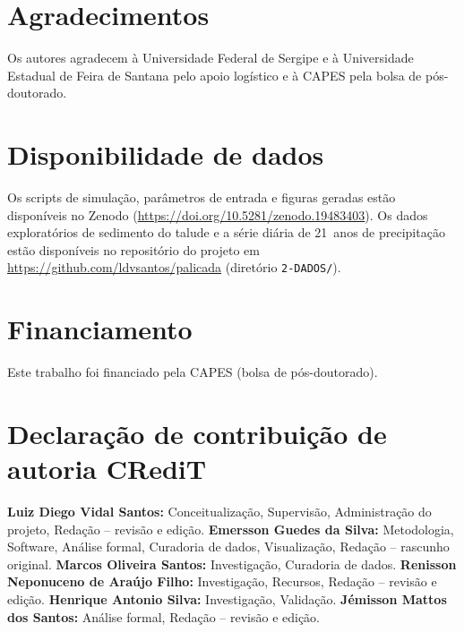 \documentclass[preprint,review,12pt,authoryear]{elsarticle}
\begin{document}
\section*{Agradecimentos}

Os autores agradecem à Universidade Federal de Sergipe e à Universidade Estadual de Feira de Santana pelo apoio logístico e à CAPES pela bolsa de pós-doutorado.

\section*{Disponibilidade de dados}

Os scripts de simulação, parâmetros de entrada e figuras geradas estão disponíveis no Zenodo (\url{https://doi.org/10.5281/zenodo.19483403}). Os dados exploratórios de sedimento do talude e a série diária de 21~anos de precipitação estão disponíveis no repositório do projeto em \url{https://github.com/ldvsantos/palicada} (diretório \texttt{2-DADOS/}).

\section*{Financiamento}

Este trabalho foi financiado pela CAPES (bolsa de pós-doutorado).

\section*{Declaração de contribuição de autoria CRediT}

\textbf{Luiz Diego Vidal Santos:} Conceitualização, Supervisão, Administração do projeto, Redação -- revisão e edição. \textbf{Emersson Guedes da Silva:} Metodologia, Software, Análise formal, Curadoria de dados, Visualização, Redação -- rascunho original. \textbf{Marcos Oliveira Santos:} Investigação, Curadoria de dados. \textbf{Renisson Neponuceno de Araújo Filho:} Investigação, Recursos, Redação -- revisão e edição. \textbf{Henrique Antonio Silva:} Investigação, Validação. \textbf{Jémisson Mattos dos Santos:} Análise formal, Redação -- revisão e edição.
\end{document}
